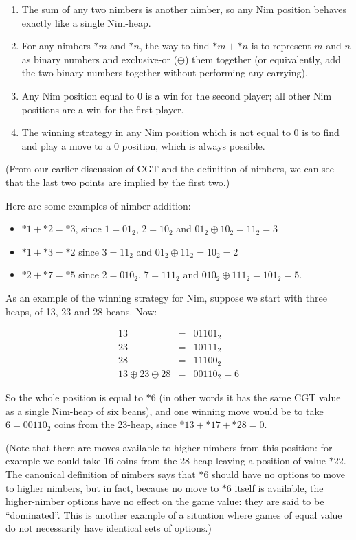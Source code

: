 \documentclass[a4paper,twocolumn]{article}
\begin{document}
\begin{enumerate}
  \item The sum of any two nimbers is another nimber, so any Nim
    position behaves exactly like a single Nim-heap.
  \item For any nimbers $*m$ and $*n$, the way to find $*m + *n$ is to
    represent $m$ and $n$ as binary numbers and exclusive-or
    ($\oplus$) them together (or equivalently, add the two binary
    numbers together without performing any carrying).
  \item Any Nim position equal to $0$ is a win for the second player;
    all other Nim positions are a win for the first player.
  \item The winning strategy in any Nim position which is not equal to
    $0$ is to find and play a move to a $0$ position, which is always
    possible.
\end{enumerate}

(From our earlier discussion of CGT and the definition of nimbers, we
can see that the last two points are implied by the first two.)

Here are some examples of nimber addition:

\begin{itemize}
  \item $*1 + *2 = *3$, since $1 = 01_2$, $2 = 10_2$ and $01_2 \oplus
    10_2 = 11_2 = 3$
  \item $*1 + *3 = *2$ since $3 = 11_2$ and $01_2 \oplus 11_2 = 10_2 =
    2$
  \item $*2 + *7 = *5$ since $2 = 010_2$, $7 = 111_2$ and $010_2
    \oplus 111_2 = 101_2 = 5$.
\end{itemize}

As an example of the winning strategy for Nim, suppose we start with
three heaps, of 13, 23 and 28 beans. Now:

\begin{eqnarray*}
  13 & = & 01101_2 \\
  23 & = & 10111_2 \\
  28 & = & 11100_2 \\
  13 \oplus 23 \oplus 28 & = & 00110_2 = 6
\end{eqnarray*}

So the whole position is equal to $*6$ (in other words it has the same
CGT value as a single Nim-heap of six beans), and one winning move
would be to take $6 = 00110_2$ coins from the 23-heap, since $*13 +
*17 + *28 = 0$.

(Note that there are moves available to higher nimbers from this
position: for example we could take 16 coins from the 28-heap leaving
a position of value $*22$. The canonical definition of nimbers says
that $*6$ should have no options to move to higher nimbers, but in
fact, because no move to $*6$ itself is available, the higher-nimber
options have no effect on the game value: they are said to be
``dominated''. This is another example of a situation where games of
equal value do not necessarily have identical sets of options.)
\end{document}
